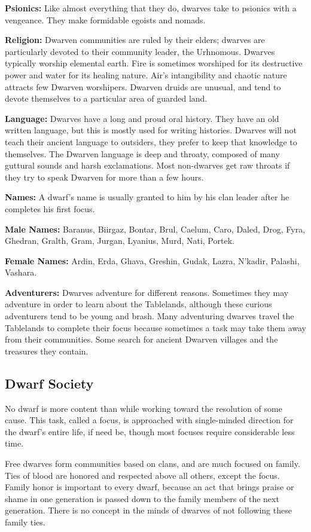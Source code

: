 \textbf{Psionics:} Like almost everything that they do, dwarves take to psionics with a vengeance. They make formidable egoists and nomads.

\textbf{Religion:} Dwarven communities are ruled by their elders; dwarves are particularly devoted to their community leader, the Urhnomous. Dwarves typically worship elemental earth. Fire is sometimes worshiped for its destructive power and water for its healing nature. Air's intangibility and chaotic nature attracts few Dwarven worshipers. Dwarven druids are unusual, and tend to devote themselves to a particular area of guarded land.

\textbf{Language:} Dwarves have a long and proud oral history. They have an old written language, but this is mostly used for writing histories. Dwarves will not teach their ancient language to outsiders, they prefer to keep that knowledge to themselves. The Dwarven language is deep and throaty, composed of many guttural sounds and harsh exclamations. Most non-dwarves get raw throats if they try to speak Dwarven for more than a few hours.

\textbf{Names:} A dwarf's name is usually granted to him by his clan leader after he completes his first focus.

\textbf{Male Names:} Baranus, Biirgaz, Bontar, Brul, Caelum, Caro, Daled, Drog, Fyra, Ghedran, Gralth, Gram, Jurgan, Lyanius, Murd, Nati, Portek.

\textbf{Female Names:} Ardin, Erda, Ghava, Greshin, Gudak, Lazra, N'kadir, Palashi, Vashara.

\textbf{Adventurers:} Dwarves adventure for different reasons. Sometimes they may adventure in order to learn about the Tablelands, although these curious adventurers tend to be young and brash. Many adventuring dwarves travel the Tablelands to complete their focus because sometimes a task may take them away from their communities. Some search for ancient Dwarven villages and the treasures they contain.

\subsection{Dwarf Society}
No dwarf is more content than while working toward the resolution of some cause. This task, called a focus, is approached with single-minded direction for the dwarf's entire life, if need be, though most focuses require considerable less time.

Free dwarves form communities based on clans, and are much focused on family. Ties of blood are honored and respected above all others, except the focus. Family honor is important to every dwarf, because an act that brings praise or shame in one generation is passed down to the family members of the next generation. There is no concept in the minds of dwarves of not following these family ties.


